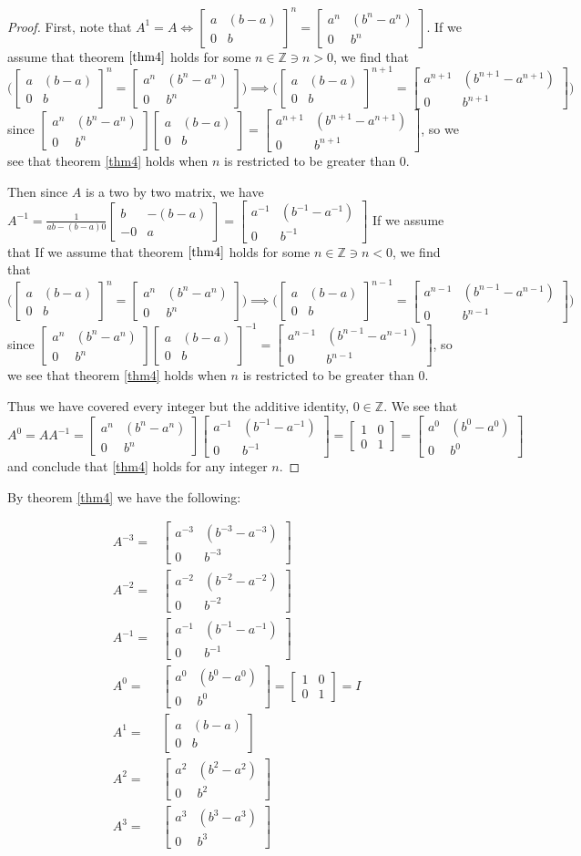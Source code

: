 \documentclass[12pt]{article}
\newcommand{\ints}{\mathbb{Z}}
\newcommand{\glmatrix}[4]{\ensuremath{\begin{bmatrix} #1 & #2 \\ #3 & #4 \end{bmatrix}}}
\newcommand{\glinverse}[4]{\ensuremath{\frac{1}{#1 #4 - #2 #3}\glmatrix{#4}{-#2}{-#3}{#1}}}
\begin{document}
\begin{proof}
	First, note that $A^1 = A \iff \glmatrix{a}{(b-a)}{0}{b}^n = \glmatrix{a^n}{(b^n-a^n)}{0}{b^n}$.
	If we assume that theorem $\ref{thm4}$ holds for some $n \in \ints \ni n > 0$,
	we find that $\Big(\glmatrix{a}{(b-a)}{0}{b}^n = \glmatrix{a^n}{(b^n-a^n)}{0}{b^n}\Big)
	\implies \Big(\glmatrix{a}{(b-a)}{0}{b}^{n+1} = \glmatrix{a^{n+1}}{(b^{n+1}-a^{n+1})}{0}{b^{n+1}}\Big)$
	since $\glmatrix{a^n}{(b^n-a^n)}{0}{b^n}\glmatrix{a}{(b-a)}{0}{b} =
	\glmatrix{a^{n+1}}{(b^{n+1}-a^{n+1})}{0}{b^{n+1}}$,
	so we see that theorem \ref{thm4} holds when $n$ is restricted
	to be greater than $0$.

	Then since $A$ is a two by two matrix,
	we have $A^{-1} = \glinverse{a}{(b-a)}{0}{b} = \glmatrix{a^{-1}}{(b^{-1}-a^{-1})}{0}{b^{-1}}$
	If we assume that 
	If we assume that theorem $\ref{thm4}$ holds for some $n \in \ints \ni n < 0$,
	we find that $\Big(\glmatrix{a}{(b-a)}{0}{b}^n = \glmatrix{a^n}{(b^n-a^n)}{0}{b^n}\Big)
	\implies \Big(\glmatrix{a}{(b-a)}{0}{b}^{n-1} = \glmatrix{a^{n-1}}{(b^{n-1}-a^{n-1})}{0}{b^{n-1}}\Big)$
	since $\glmatrix{a^n}{(b^n-a^n)}{0}{b^n}\glmatrix{a}{(b-a)}{0}{b}^{-1} =
	\glmatrix{a^{n-1}}{(b^{n-1}-a^{n-1})}{0}{b^{n-1}}$,
	so we see that theorem \ref{thm4} holds when $n$ is restricted
	to be greater than $0$.

	Thus we have covered every integer but the additive identity, $0 \in \ints$.
	We see that $A^0 = AA^{-1} = 
	\glmatrix{a^n}{(b^n-a^n)}{0}{b^n} \glmatrix{a^{-1}}{(b^{-1}-a^{-1})}{0}{b^{-1}}
	= \glmatrix{1}{0}{0}{1}
	= \glmatrix{a^0}{(b^0-a^0)}{0}{b^0}$
	and conclude that \ref{thm4} holds for any integer $n$.
\end{proof}

By theorem \ref{thm4} we have the following:

\begin{align}
	A^{-3} = & \glmatrix{a^{-3}}{(b^{-3}-a^{-3})}{0}{b^{-3}}\\
	A^{-2} = & \glmatrix{a^{-2}}{(b^{-2}-a^{-2})}{0}{b^{-2}} \\
	A^{-1} = & \glmatrix{a^{-1}}{(b^{-1}-a^{-1})}{0}{b^{-1}}\\
	A^0 = & \glmatrix{a^0}{(b^0-a^0)}{0}{b^0} = \glmatrix{1}{0}{0}{1} = I \\
	A^1 = & \glmatrix{a}{(b-a)}{0}{b} \\
	A^2 = & \glmatrix{a^2}{(b^2-a^2)}{0}{b^2}\\
	A^3 = & \glmatrix{a^3}{(b^3-a^3)}{0}{b^3}
\end{align}
\end{document}
